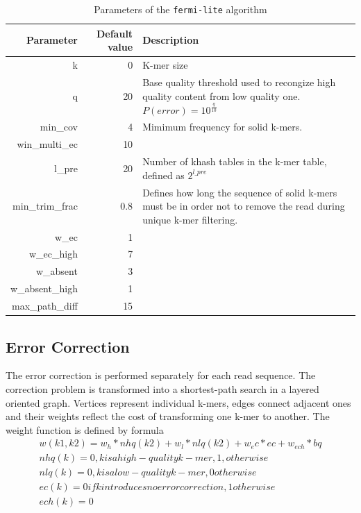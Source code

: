 \begin{table}[h]
\caption{Parameters of the \texttt{fermi-lite} algorithm}
\label{tab:fermi-parameters}
\begin{tabular}{| r | r | l |}
\hline
Parameter & Default value & Description \\
\hline
k & 0 & K-mer size \\
\hline
q & 20 & Base quality threshold used to recongize high quality content from low quality one. $P(error) = 10^{\frac{q}{10}}$ \\
\hline
min\_cov & 4 & Mimimum frequency for solid k-mers. \\
\hline
win\_multi\_ec & 10 &  \\
\hline
l\_pre & 20 & Number of khash tables in the k-mer table, defined as $2^{l\_pre}$ \\
\hline
min\_trim\_frac & 0.8 &  Defines how long the sequence of solid k-mers must be in order not to remove the read during unique k-mer filtering. \\
\hline
w\_ec & 1 &  \\
\hline
w\_ec\_high & 7 &  \\
\hline
w\_absent & 3 &  \\
\hline
w\_absent\_high & 1 &  \\ 
\hline
max\_path\_diff & 15 &  \\ 
\hline
\end{tabular}
\end{table}

\subsection{Error Correction}
\label{subsec:fermi-error-correction}

The error correction is performed separately for each read sequence. The correction problem is transformed into a shortest-path search in a layered oriented graph. Vertices represent individual k-mers, edges connect adjacent ones and their weights reflect the cost of transforming one k-mer to another. The weight function is defined by formula
\begin{gather}
	w(k1, k2) = w_h*nhq(k2) + w_l*nlq(k2) + w_ec*ec + w_{ech}*bq \\
	nhq(k) = 0, k is a high-quality k-mer, 1, otherwise \\
	nlq(k) = 0, k is a low-quality k-mer, 0 otherwise \\
	ec(k) = 0 if k introduces no error correction, 1 otherwise \\
	ech(k) = 0
\end{gather}

